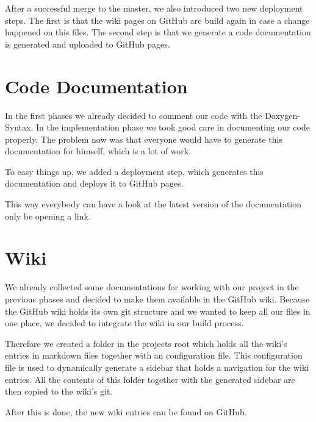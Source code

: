 \documentclass[parskip=full]{scrartcl}
\begin{document}
After a successful merge to the master, we also introduced two new deployment steps.
The first is that the wiki pages on GitHub are build again in case a change happened on this files.
The second step is that we generate a code documentation is generated and uploaded to GitHub pages.

\newpage

\section{Code Documentation}

In the first phases we already decided to comment our code with the Doxygen-Syntax.
In the implementation phase we took good care in documenting our code properly.
The problem now was that everyone would have to generate this documentation for himself, which is a lot of work.

To easy things up, we added a deployment step, which generates this documentation and deploys it to GitHub pages.

This way everybody can have a look at the latest version of the documentation only be opening a link.

\newpage

\section{Wiki}

We already collected some documentations for working with our project in the previous phases and decided to make them available in the GitHub wiki.
Because the GitHub wiki holds its own git structure and we wanted to keep all our files in one place, we decided to integrate the wiki in our build process.

Therefore we created a folder in the projects root which holds all the wiki's entries in markdown files together with an configuration file.
This configuration file is used to dynamically generate a sidebar that holds a navigation for the wiki entries.
All the contents of this folder together with the generated sidebar are then copied to the wiki's git.

After this is done, the new wiki entries can be found on GitHub.

\newpage
\end{document}
